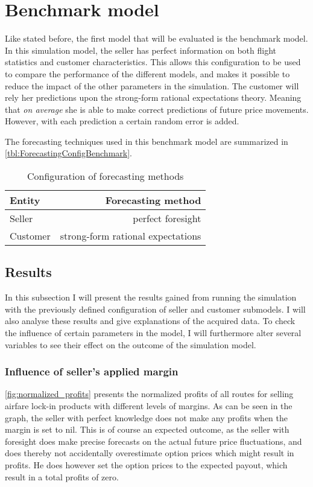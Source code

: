 \section{Benchmark model}
Like stated before, the first model that will be evaluated is the benchmark model. In this simulation model, the seller has perfect information on both flight statistics and customer characteristics. This allows this configuration to be used to compare the performance of the different models, and makes it possible to reduce the impact of the other parameters in the simulation. The customer will rely her predictions upon the strong-form rational expectations theory. Meaning that \emph{on average} she is able to make correct predictions of future price movements. However, with each prediction a certain random error is added.

The forecasting techniques used in this benchmark model are summarized in \autoref{tbl:ForecastingConfigBenchmark}.

\begin{table}
    \centering
    \begin{tabular}{l  r}
    \toprule
    Entity      &  Forecasting method \\
    \midrule
    Seller    &  perfect foresight  \\
    Customer  &  strong-form rational expectations \\
    \bottomrule
    \end{tabular}
    \caption{Configuration of forecasting methods}
    \label{tbl:ForecastingConfigBenchmark}
\end{table}


\subsection{Results}
In this subsection I will present the results gained from running the simulation with the previously defined configuration of seller and customer submodels. I will also analyse these results and give explanations of the acquired data. To check the influence of certain parameters in the model, I will furthermore alter several variables to see their effect on the outcome of the simulation model.

\subsubsection{Influence of seller's applied margin}
\autoref{fig:normalized_profits} presents the normalized profits of all routes for selling airfare lock-in products with different levels of margins. As can be seen in the graph, the seller with perfect knowledge does not make any profits when the margin is set to nil. This is of course an expected outcome, as the seller with foresight does make precise forecasts on the actual future price fluctuations, and does thereby not accidentally overestimate option prices which might result in profits. He does however set the option prices to the expected payout, which result in a total profits of zero.

